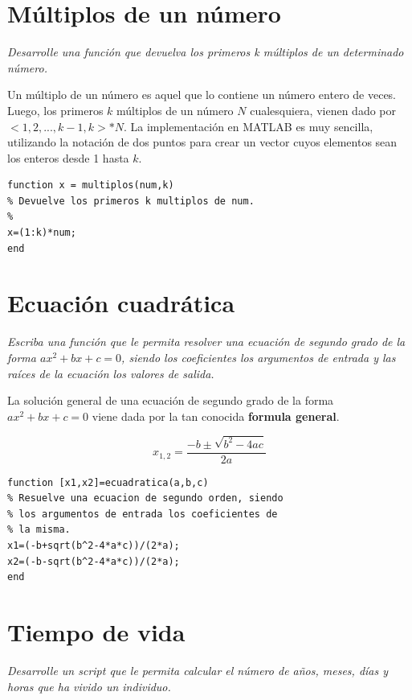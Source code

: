 \section{Múltiplos de un número}

\textit{Desarrolle una función que devuelva los primeros k múltiplos de un determinado número.}

\sol

Un múltiplo de un número es aquel que lo contiene un número entero de veces. Luego, los primeros $k$ 
múltiplos de un número $N$ cualesquiera, vienen dado por $<1,2,...,k-1,k>*N$. La implementación 
en MATLAB es muy sencilla, utilizando la notación de dos puntos para crear un vector cuyos elementos 
sean los enteros desde 1 hasta $k$.

\begin{verbatim}
function x = multiplos(num,k)
% Devuelve los primeros k multiplos de num.
%
x=(1:k)*num;
end
\end{verbatim}


\section{Ecuación cuadrática}

\textit{Escriba una función que le permita resolver una ecuación de segundo grado de la forma 
$ax^2+bx+c=0$, siendo los coeficientes los argumentos de entrada y las raíces de la ecuación los valores de salida.}

\sol

La solución general de una ecuación de segundo grado de la forma $ax^2+bx+c=0$ viene dada por la tan conocida 
{\bf formula general}.

$$x_{1,2}=\frac{-b\pm\sqrt{b^2-4ac}}{2a}$$

\begin{verbatim}
function [x1,x2]=ecuadratica(a,b,c)
% Resuelve una ecuacion de segundo orden, siendo
% los argumentos de entrada los coeficientes de
% la misma.
x1=(-b+sqrt(b^2-4*a*c))/(2*a);
x2=(-b-sqrt(b^2-4*a*c))/(2*a);
end
\end{verbatim}


\section{Tiempo de vida}

\textit{Desarrolle un script que le permita calcular el número de años, meses, días y horas que ha vivido un individuo.}

